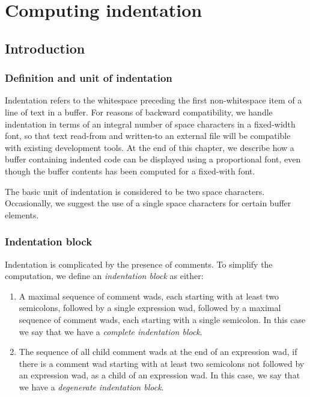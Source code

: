 \section{Computing indentation}
\label{sec-internals-common-lisp-mode-indentation}

\subsection{Introduction}

\subsubsection{Definition and unit of indentation}

Indentation refers to the whitespace preceding the first
non-whitespace item of a line of text in a buffer.  For reasons of
backward compatibility, we handle indentation in terms of an integral
number of space characters in a fixed-width font, so that text
read-from and written-to an external file will be compatible with
existing development tools.  At the end of this chapter, we describe
how a buffer containing indented \commonlisp{} code can be displayed
using a proportional font, even though the buffer contents has been
computed for a fixed-with font.

The basic unit of indentation is considered to be two space
characters.  Occasionally, we suggest the use of a single space
characters for certain buffer elements.

\subsubsection{Indentation block}

Indentation is complicated by the presence of comments.  To simplify
the computation, we define an \emph{indentation block} as either:

\begin{enumerate}
\item A maximal sequence of comment wads, each starting with at least
  two semicolons, followed by a single expression wad, followed by a
  maximal sequence of comment wads, each starting with a single
  semicolon.  In this case we say that we have a \emph{complete
    indentation block}.
\item The sequence of all child comment wads at the end of an
  expression wad, if there is a comment wad starting with at least two
  semicolons not followed by an expression wad, as a child of an
  expression wad.  In this case, we say that we have a
  \emph{degenerate indentation block}.
\end{enumerate}

